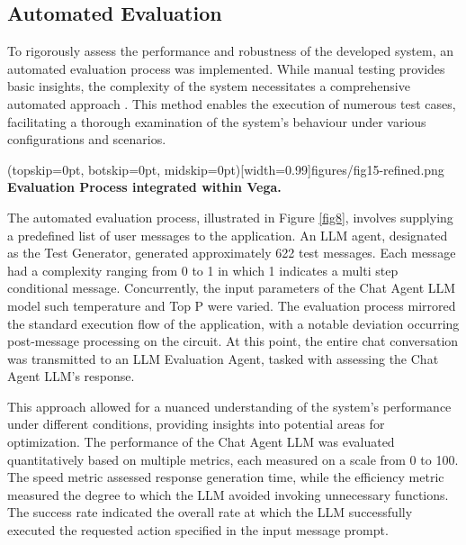 \documentclass{ieeeaccess}
\begin{document}
\subsection{Automated Evaluation}
To rigorously assess the performance and robustness of the developed system, an automated evaluation process was implemented. While manual testing provides basic insights, the complexity of the system necessitates a comprehensive automated approach \cite{1290484}. This method enables the execution of numerous test cases, facilitating a thorough examination of the system's behaviour under various configurations and scenarios.

\Figure[t!](topskip=0pt, botskip=0pt, midskip=0pt)[width=0.99\columnwidth]{{figures/fig15-refined.png}}
{ \textbf{Evaluation Process integrated within Vega.}\label{fig8}}

The automated evaluation process, illustrated in Figure \ref{fig8}, involves supplying a predefined list of user messages to the application. An LLM agent, designated as the Test Generator, generated approximately 622 test messages. Each message had a complexity ranging from 0 to 1 in which 1 indicates a multi step conditional message. Concurrently, the input parameters of the Chat Agent LLM model such temperature and Top P \cite{rum2024setting} were varied. The evaluation process mirrored the standard execution flow of the application, with a notable deviation occurring post-message processing on the circuit. At this point, the entire chat conversation was transmitted to an LLM Evaluation Agent, tasked with assessing the Chat Agent LLM's response. 

This approach allowed for a nuanced understanding of the system's performance under different conditions, providing insights into potential areas for optimization. The performance of the Chat Agent LLM was evaluated quantitatively based on multiple metrics, each measured on a scale from 0 to 100. The speed metric assessed response generation time, while the efficiency metric measured the degree to which the LLM avoided invoking unnecessary functions. The success rate indicated the overall rate at which the LLM successfully executed the requested action specified in the input message prompt.
\end{document}
